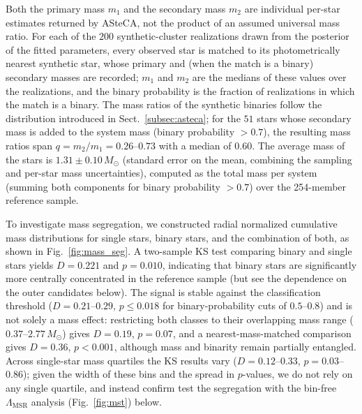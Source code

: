 \documentclass{aa}
\providecommand{\DIFaddtex}[1]{{\protect\color[rgb]{0,0,0.7}#1}} %
\providecommand{\DIFdeltex}[1]{{\protect\color[rgb]{0.65,0,0}\footnotesize #1}} %
\providecommand{\DIFaddbegin}{} %
\providecommand{\DIFaddend}{} %
\providecommand{\DIFdelbegin}{} %
\providecommand{\DIFdelend}{} %
\providecommand{\DIFadd}[1]{\texorpdfstring{\DIFaddtex{#1}}{#1}} %
\providecommand{\DIFdel}[1]{\texorpdfstring{\DIFdeltex{#1}}{}} %
\providecommand{\DIFscaledelfig}{0.5}
\newlength{\DIFdelgraphicswidth} %
\newlength{\DIFdelgraphicsheight} %
\providecommand{\DIFaddincludegraphics}[2][]{{\color{blue}\fbox{\DIFOincludegraphics[#1]{#2}}}} %
\providecommand{\DIFdelincludegraphics}[2][]{%
\sbox{\DIFdelgraphicsbox}{\DIFOincludegraphics[#1]{#2}}%
\settoboxwidth{\DIFdelgraphicswidth}{\DIFdelgraphicsbox} %
\settoboxtotalheight{\DIFdelgraphicsheight}{\DIFdelgraphicsbox} %
\scalebox{\DIFscaledelfig}{%
\parbox[b]{\DIFdelgraphicswidth}{\usebox{\DIFdelgraphicsbox}\\[-\baselineskip] \rule{\DIFdelgraphicswidth}{0em}}\llap{\resizebox{\DIFdelgraphicswidth}{\DIFdelgraphicsheight}{%
\setlength{\unitlength}{\DIFdelgraphicswidth}%
\begin{picture}(1,1)%
\thicklines\linethickness{2pt} %
{\color[rgb]{1,0,0}\put(0,0){\framebox(1,1){}}}%
{\color[rgb]{1,0,0}\put(0,0){\line( 1,1){1}}}%
{\color[rgb]{1,0,0}\put(0,1){\line(1,-1){1}}}%
\end{picture}%
}\hspace*{3pt}}} %
} %
\DeclareRobustCommand{\DIFaddbegin}{\DIFOaddbegin \let\includegraphics\DIFaddincludegraphics} %
\DeclareRobustCommand{\DIFaddend}{\DIFOaddend \let\includegraphics\DIFOincludegraphics} %
\DeclareRobustCommand{\DIFdelbegin}{\DIFOdelbegin \let\includegraphics\DIFdelincludegraphics} %
\DeclareRobustCommand{\DIFdelend}{\DIFOaddend \let\includegraphics\DIFOincludegraphics} %
\begin{document}
Both the primary mass $m_1$ and the secondary mass $m_2$ are individual per-star estimates returned by ASteCA, not the product of an assumed universal mass ratio. For each of the $200$ synthetic-cluster realizations drawn from the posterior of the fitted parameters, every observed star is matched to its photometrically nearest synthetic star, whose primary and (when the match is a binary) secondary masses are recorded; $m_1$ and $m_2$ are the medians of these values over the realizations, and the binary probability is the fraction of realizations in which the match is a binary. The mass ratios of the synthetic binaries follow the \citet{2013ARA&A..51..269D} distribution introduced in Sect.~\ref{subsec:asteca}; for the $51$ stars whose secondary mass is added to the system mass (binary probability $>0.7$), the resulting mass ratios span $q=m_2/m_1=0.26$--$0.73$ with a median of $0.60$. The average mass of the stars is $1.31 \pm 0.10\,M_\odot$ (standard error on the mean, combining the sampling and per-star mass uncertainties), computed as the total mass per system (summing both components for binary probability $>0.7$) over the 254-member reference sample.

To investigate mass segregation, we constructed radial normalized cumulative mass distributions for single stars, binary stars, and the combination of both, as shown in Fig.~\ref{fig:mass_seg}. A two-sample KS test comparing binary and single stars yields $D=0.221$ and $p=0.010$, indicating that binary stars are significantly more centrally concentrated \DIFaddbegin \DIFadd{in the reference sample (but see the dependence on the outer candidates below)}\DIFaddend . The signal is stable against the classification threshold ($D=0.21$--$0.29$, $p\leq0.018$ for binary-probability cuts of $0.5$--$0.8$) and is not solely a mass effect: restricting both classes to their overlapping mass range ($0.37$--$2.77\,M_\odot$) gives $D=0.19$, $p=0.07$, and a nearest-mass-matched comparison gives $D=0.36$, $p<0.001$, although mass and binarity remain partially entangled. Across single-star mass quartiles the KS results vary ($D=0.12$--$0.33$, $p=0.03$--$0.86$); given the width of these bins and the spread in $p$-values, we do not rely on any single quartile, and instead \DIFdelbegin \DIFdel{confirm }\DIFdelend \DIFaddbegin \DIFadd{test }\DIFaddend the segregation with the bin-free $\Lambda_{\mathrm{MSR}}$ analysis (Fig.~\ref{fig:mst}) below.
\end{document}
